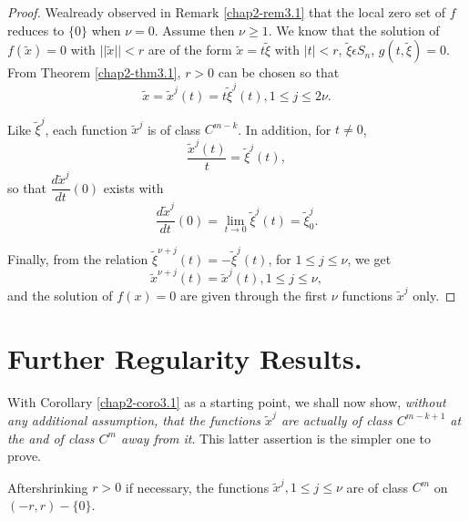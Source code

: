 \begin{proof}
We\pageoriginale already observed in Remark \ref{chap2-rem3.1} that
the local zero set of $f$ reduces to $\{0\}$ when $\nu = 0$. Assume then
$\nu \geq 1$. We know that the solution of $f(\widetilde{x}) = 0$
with $||\widetilde{x}|| < r$ are of the form $\widetilde{x} =
t\widetilde{\xi}$ with $|t| < r$, $\widetilde{\xi} \epsilon S_{n}$,
$g(t, \widetilde{\xi}) = 0$. From Theorem \ref{chap2-thm3.1}, $r > 0$
can be chosen so that
$$
\widetilde{x} = \widetilde{x}^{j}(t) = t\widetilde{\xi}^{j}(t), 1
\leq j \leq 2\nu.
$$

Like $\widetilde{\xi}^{j}$, each function $\widetilde{x}^{j}$ is of
class $C^{m-k}$. In addition, for $t \neq 0$,
$$
\frac{\widetilde{x}^{j}(t)}{t} = \widetilde{\xi}^{j}(t),
$$
so that $\dfrac{d\widetilde{x}^{j}}{dt}(0)$ exists with
$$
\frac{d\widetilde{x}^{j}}{dt}(0) = \lim_{t \to 0}
\widetilde{\xi}^{j}(t) = \widetilde{\xi}_{0}^{j}.
$$

Finally, from the relation $\widetilde{\xi}^{\nu+j}(t) =
-\widetilde{\xi}^{j}(t)$, for $1 \leq j \leq \nu$, we get
$$
\widetilde{x}^{\nu + j}(t) = \widetilde{x}^{j}(t), 1 \leq j \leq \nu,
$$
and the solution of $f(x) = 0$ are given through the first $\nu$
functions $\widetilde{x}^{j}$ only.
\end{proof}

\section{Further Regularity Results.}\label{chap2-sec4}

With Corollary \ref{chap2-coro3.1} as a starting point, we shall now
show, {\em without any additional assumption, that the functions
  $\widetilde{x}^{j}$ are actually of class $C^{m-k+1}$ at the and of
  class $C^{m}$ away from it}. This latter assertion is the simpler one
to prove.

\begin{lemma}\label{chap2-lem4.1}
After\pageoriginale shrinking $r > 0$ if necessary, the functions
$\widetilde{x}^{j}, 1 \leq j \leq \nu$ are of class $C^{m}$ on $(-r,
r) - \{0\}$.
\end{lemma}

